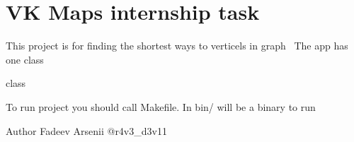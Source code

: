 \chapter{VK Maps internship task}
\hypertarget{index}{}\label{index}
This project is for finding the shortest ways to verticels in graph~\newline
The app has one class
\begin{DoxyItemize}
\item {} class
\end{DoxyItemize}

To run project you should call Makefile. In bin/ will be a binary to run

\begin{DoxyAuthor}{Author}
Fadeev Arsenii @r4v3\+\_\+d3v11 
\end{DoxyAuthor}
